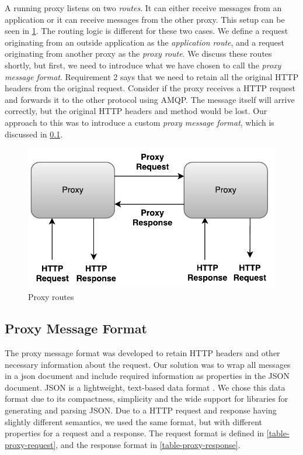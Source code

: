 A running proxy listens on two \textit{routes}. It can either receive messages
from an application or it can receive messages from the other proxy. This setup
can be seen in \cref{figure:dil-routes}. The routing logic is different for
these two cases. We define a request originating from an outside application as
the \textit{application route}, and a request originating from another proxy as
the \textit{proxy route}. We discuss these routes shortly, but first, we need to
introduce what we have chosen to call the \textit{proxy message format}.
Requirement 2 says that we need to retain all the original HTTP headers from the
original request. Consider if the proxy receives a HTTP request and forwards it
to the other protocol using AMQP. The message itself will arrive correctly, but
the original HTTP headers and method would be lost. Our approach to this was to
introduce a custom \textit{proxy message format}, which is discussed in
\cref{section:proxy-header-format}.

\begin{figure}[h]
\centering
\includegraphics[scale=0.7]{images/dil_routes.pdf}
\caption{Proxy routes}
\label{figure:dil-routes}
\end{figure}



\subsection{Proxy Message Format}
\label{section:proxy-header-format}

The proxy message format was developed to retain HTTP headers and other
necessary information about the request. Our solution was to wrap all messages
in a \gls{json} document and include required information as properties in the
JSON document. JSON is a lightweight, text-based data format \cite{rfc-json}. We
chose this data format due to its compactness, simplicity and the wide support
for libraries for generating and parsing JSON. Due to a HTTP request and
response having slightly different semantics, we used the same format, but with
different properties for a request and a response. The request format is defined
in \cref{table-proxy-request}, and the response format in
\cref{table-proxy-response}.

